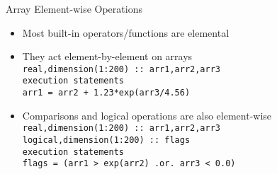 \documentclass{beamer}
\begin{document}
\begin{frame}{Array Element-wise Operations}

  \begin{itemize}
    \item Most built-in operators/functions are elemental
    \vfill\item They act element-by-element on arrays \\

    \vfill
    \hspace{1cm} \texttt{real,dimension(1:200) :: arr1,arr2,arr3} \\
    \hspace{1cm} \texttt{execution statements} \\
    \hspace{1cm} \texttt{arr1 = arr2 + 1.23*exp(arr3/4.56)} \\

    \vfill\item Comparisons and logical operations are also element-wise \\
    \vfill
    \hspace{1cm} \texttt{real,dimension(1:200) :: arr1,arr2,arr3} \\
    \hspace{1cm} \texttt{logical,dimension(1:200) :: flags} \\
    \hspace{1cm} \texttt{execution statements} \\
    \hspace{1cm} \texttt{flags = (arr1 > exp(arr2) .or. arr3 < 0.0)}
  \end{itemize}

\end{frame}
\end{document}
